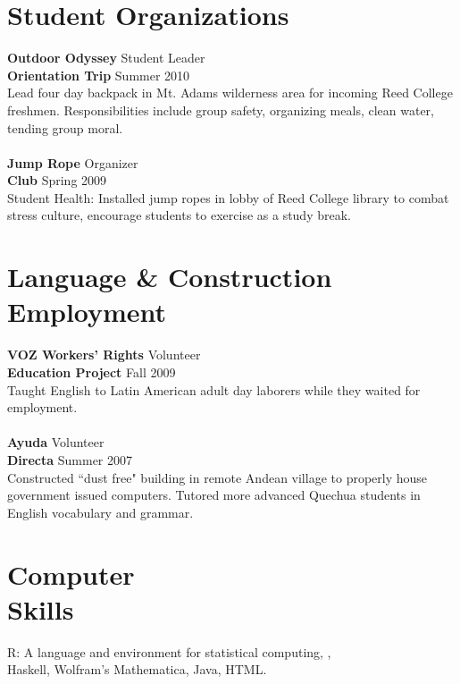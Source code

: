 \documentclass[margin,line]{resume}
\begin{document}
\begin{resume}
\section{\mysidestyle Student Organizations }

\textbf{Outdoor Odyssey} \hfill Student Leader \\
\textbf{Orientation Trip} \hfill Summer 2010 \\
Lead four day backpack in Mt. Adams wilderness area for incoming Reed College freshmen. Responsibilities include group safety, organizing meals, clean water, tending group moral.
\\\vspace{-2mm}\\
\textbf{Jump Rope} \hfill Organizer
\\\textbf{Club}  \hfill Spring 2009\\
Student Health: Installed jump ropes in lobby of Reed College library to combat stress culture, encourage students to exercise as a study break. 

\section{\mysidestyle Language \& Construction \\ Employment}
\textbf{VOZ Workers' Rights}  \hfill Volunteer \\ \textbf{Education Project} \hfill Fall 2009 \\ Taught English to Latin American adult day laborers while they waited for employment. \\
\vspace{-2mm}\\    
\textbf{Ayuda} \hfill Volunteer \\    
\textbf{Directa} \hfill Summer 2007	\\
Constructed ``dust free" building in remote Andean village to properly house government issued computers. Tutored more advanced Quechua students in English vocabulary and grammar.    


\newpage

    \section{\mysidestyle Computer\\Skills}
 R: A language and environment for statistical computing, \LaTeXe, \\ Haskell, Wolfram's Mathematica, Java, HTML.

\end{resume}
\end{document}

